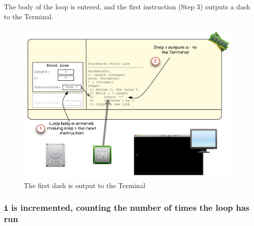 The body of the loop is entered, and the first instruction (Step 3) outputs a dash to the Terminal.

\begin{figure}[htbp]
   \centering
   \includegraphics[width=\textwidth]{./topics/control-flow/images/PrintLine3} 
   \caption{The first dash is output to the Terminal}
   \label{fig:print-line-3}
\end{figure}



\clearpage
\subsubsection{\texttt{i} is incremented, counting the number of times the loop has run} %
\label{ssub:i_is_incremented_to_count_the_loops}

